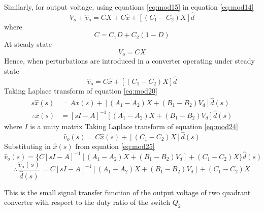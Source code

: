 	Similarly, for output voltage, using equations \eqref{eq:mod15} in equation \eqref{eq:mod14}
	\begin{equation}
		V_o + \hat{v}_o = CX + C\hat{x} + [(C_1-C_2)X]\hat{d}
		\label{eq:mod21}
	\end{equation}
	where
	\begin{equation}
		C = C_1D+C_2(1-D)
		\label{eq:mod22}
	\end{equation}
	At steady state
	\begin{equation}
		V_o = CX
		\label{eq:mod23}
	\end{equation}
	Hence, when perturbations are introduced in a converter operating under steady state
		\begin{equation}
		\hat{v}_o = C\hat{x}+[(C_1-C_2)X]\hat{d}
		\label{eq:mod24}
	\end{equation}
	Taking Laplace transform of equation \eqref{eq:mod20}
	\begin{align}
		s\hat{x}(s) &= Ax(s)+[(A_1-A_2)X+(B_1-B_2)V_d]\hat{d}(s)\\
		\therefore \hat{x}(s) &= [sI-A]^{-1}[(A_1-A_2)X+(B_1-B_2)V_d]\hat{d}(s)
		\label{eq:mod25}
	\end{align}
	where $I$ is a unity matrix
	Taking Laplace transform of equation \eqref{eq:mod24}
	\begin{equation}
		\hat{v}_o(s) = C\hat{x}(s)+[(C_1-C_2)X]\hat{d}(s)
		\label{eq:mod26}
	\end{equation}
	Substituting in $\hat{x}(s)$ from equation \eqref{eq:mod25}
	\begin{equation}
		\hat{v}_o(s) = \{C[sI-A]^{-1}[(A_1-A_2)X+(B_1-B_2)V_d]+(C_1-C_2)X\}\hat{d}(s)
		\label{eq:mod27b}
	\end{equation}
	\begin{equation}
		\therefore \dfrac{\hat{v}_o(s)}{\hat{d}(s)} = C[sI-A]^{-1}[(A_1-A_2)X+(B_1-B_2)V_d]+(C_1-C_2)X
		\label{eq:mod27}
	\end{equation}

	This is the small signal transfer function of the output voltage of two quadrant converter with respect to the duty ratio of the switch $Q_2$
